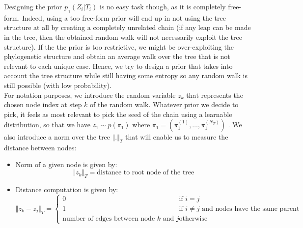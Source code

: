 Designing the prior $p_{\gamma}(Z_i | T_i)$ is no easy task though, as it is completely free-form.
Indeed, using a too free-form prior will end up in not using the tree structure at all by creating a completely unrelated chain
(if any leap can be made in the tree, then the obtained random walk will not necessarily exploit the tree structure).
If the the prior is too restrictive, we might be over-exploiting the phylogenetic structure and obtain an average walk over the tree that is not relevant to each unique case.
Hence, we try to design a prior that takes into account the tree structure while still having some entropy so any random walk is still possible (with low probability).\\

For notation purposes, we introduce the random variable $z_k$ that represents the chosen node index at step $k$ of the random walk.
Whatever prior we decide to pick, it feels as most relevant to pick the seed of the chain using a learnable distribution,
so that we have $z_{1} \sim p(\pi_1)$ where $\pi_1 = (\pi_1^{(1)}, \dots, \pi_1^{(N_T)})$ .
We also introduce a norm over the tree $\Vert . \Vert_T$ that will enable us to measure the distance between nodes:
\begin{itemize}
    \item Norm of a given node is given by:
        $$
        \Vert z_k \Vert_T = \text{distance to root node of the tree}
        $$
    \item Distance computation is given by:
          $$
            \Vert z_k - z_j \Vert_T = \left\{
            \begin{array}{ll}
                0 & \mbox{if } i = j \\
                1 & \mbox{if } i \neq j \mbox{ and nodes have the same parent} \\
                \text{number of edges between node $k$ and $j$} & \mbox{otherwise}
            \end{array}
            \right.
          $$
\end{itemize}

